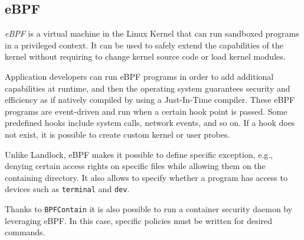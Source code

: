\subsection{eBPF}
\textit{eBPF} \cite{ebpf} is a virtual machine in the Linux Kernel that can run sandboxed programs
in a privileged context. It can be used to safely extend the capabilities of the kernel
without requiring to change kernel source code or load kernel modules.

Application developers can run eBPF programs in order to add additional capabilities at runtime,
and then the operating system guarantees security and efficiency as if natively compiled
by using a Just-In-Time compiler.
These eBPF programs are event-driven and run when a certain hook point is passed. Some
predefined hooks include system calls, network events, and so on. If a hook does not exist,
it is possible to create custom kernel or user probes.

Unlike Landlock, eBPF makes it possible to define specific exception, e.g., denying
certain access rights on specific files while allowing them on the containing directory.
It also allows to specify whether a program has access to devices such as \texttt{terminal}
and \texttt{dev}.

Thanks to \texttt{BPFContain} \cite{bpfcontain}
it is also possible to run a container security daemon by leveraging eBPF.  In this case,
specific policies must be written for desired commands.